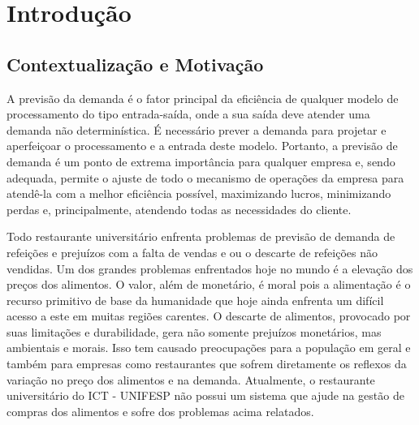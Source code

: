 \documentclass[	12pt, Times, openright, twoside, a4paper, english, brazil]{abntex2}
\begin{document}

    \tableofcontents*
    \cleardoublepage

  \textual

  \chapter{Introdução}
      \section{Contextualização e Motivação}

        \noindent 
        A previsão da demanda é o fator principal da eficiência de qualquer modelo de processamento do tipo entrada-saída, onde a sua saída deve atender uma demanda não determinística. É necessário prever a demanda para projetar e aperfeiçoar o processamento e a entrada deste modelo. 
        Portanto, a previsão de demanda é um ponto de extrema importância para qualquer empresa e, sendo adequada, permite o ajuste de todo o mecanismo de operações da empresa para atendê-la com a melhor eficiência possível, maximizando lucros, minimizando perdas e, principalmente, atendendo todas as necessidades do cliente.
        

        Todo restaurante universitário enfrenta problemas de previsão de demanda de refeições e prejuízos com a falta de vendas e ou o descarte de refeições não vendidas. Um dos grandes problemas enfrentados hoje no mundo é a elevação dos preços dos alimentos. O valor, além de monetário, é moral pois a alimentação é o recurso primitivo de base da humanidade que hoje ainda enfrenta um difícil acesso a este em muitas regiões carentes. O descarte de alimentos, provocado por suas limitações e durabilidade, gera não somente prejuízos monetários, mas  ambientais e morais. Isso tem causado preocupações para a população em geral e também para empresas como restaurantes que sofrem diretamente os reflexos da variação no preço dos alimentos e na demanda. Atualmente, o restaurante universitário do ICT - UNIFESP não possui um sistema que ajude na gestão de compras dos alimentos e sofre dos problemas acima relatados.
\end{document}
